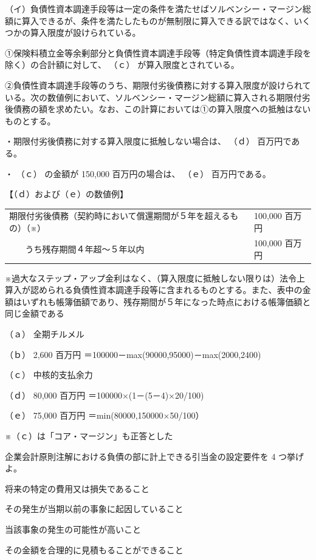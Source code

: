 \documentclass[report,gutter=10mm,fore-edge=10mm,uplatex,dvipdfmx]{jlreq}
\begin{document}
（イ）負債性資本調達手段等は一定の条件を満たせばソルベンシー・マージン総額に算入できるが、条件を満たしたものが無制限に算入できる訳ではなく、いくつかの算入限度が設けられている。

①保険料積立金等余剰部分と負債性資本調達手段等（特定負債性資本調達手段を除く）の合計額に対して、 （ｃ） が算入限度とされている。

②負債性資本調達手段等のうち、期限付劣後債務に対する算入限度が設けられている。次の数値例において、ソルベンシー・マージン総額に算入される期限付劣後債務の額を求めたい。なお、この計算においては①の算入限度への抵触はないものとする。

・期限付劣後債務に対する算入限度に抵触しない場合は、 （ｄ） 百万円である。

・ （ｃ） の金額が 150,000 百万円の場合は、 （ｅ） 百万円である。

【（ｄ）および（ｅ）の数値例】

\begin{tabularx}{\textwidth}{|X|X|X|}
\hline
\multicolumn{2}{|X|}{期限付劣後債務（契約時において償還期間が５年を超えるもの）（※）}& 100,000 百万円\\ \cline{2-3}
&うち残存期間４年超～５年以内 & 100,000 百万円\\ \hline
\end{tabularx}

※過大なステップ・アップ金利はなく、（算入限度に抵触しない限りは）法令上算入が認められる負債性資本調達手段等に含まれるものとする。また、表中の金額はいずれも帳簿価額であり、残存期間が５年になった時点における帳簿価額と同じ金額である

\answer{}

（ａ） 全期チルメル

（ｂ） 2,600 百万円 ＝100000－max(90000,95000)－max(2000,2400)

（ｃ） 中核的支払余力

（ｄ） 80,000 百万円 ＝100000×(1－(5－4)×20/100)

（ｅ） 75,000 百万円 ＝min(80000,150000×50/100）

※（ｃ）は「コア・マージン」も正答とした


企業会計原則注解における負債の部に計上できる引当金の設定要件を 4 つ挙げよ。
\answer{}

将来の特定の費用又は損失であること

その発生が当期以前の事象に起因していること

当該事象の発生の可能性が高いこと

その金額を合理的に見積もることができること
\end{document}
